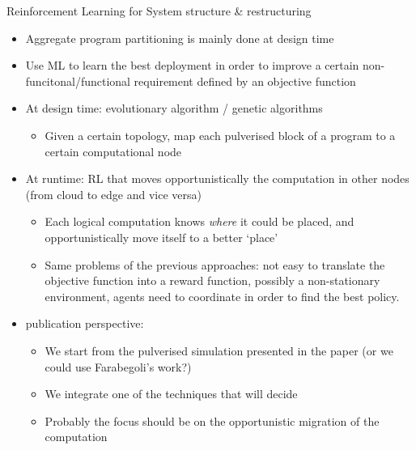 \documentclass[presentation, 9pt]{beamer}\mode<presentation>{\usetheme{AMSBolognaFC}}
\begin{document}
\begin{frame}{Reinforcement Learning for System structure \& restructuring}
	\begin{itemize}
		\item Aggregate program partitioning is mainly done at design time
		\item Use ML to learn the best deployment in order to improve a certain non-funcitonal/functional requirement defined by an objective function
		\item At design time: evolutionary algorithm / genetic algorithms
		\begin{itemize}
			\item Given a certain topology, map each pulverised block of a program to a certain computational node
		\end{itemize}
		\item At runtime: RL that moves opportunistically the computation in other nodes (from cloud to edge and vice versa)
		\begin{itemize}
			\item Each logical computation knows \emph{where} it could be placed, and opportunistically move itself to a better `place'
			\item Same problems of the previous approaches: not easy to translate the objective function into a reward function, possibly a non-stationary environment, agents need to coordinate in order to find the best policy.
		\end{itemize}
	\item publication perspective:
	\begin{itemize}
		\item We start from the pulverised simulation presented in the paper (or we could use Farabegoli's work?)
		\item We integrate one of the techniques that will decide
		\item Probably the focus should be on the opportunistic migration of the computation 
	\end{itemize}
\end{itemize}
\end{frame}
\section*{}

\section*{\refname}

\end{document}
